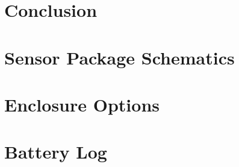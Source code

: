 \documentclass[12pt]{report}
\begin{document}
\chapter{Conclusion}
\label{ch:Collection}
	




\appendix

\chapter{Sensor Package Schematics}
\label{app:Schematic}


\chapter{Enclosure Options}
\label{app:CaseOptions}


\chapter{Battery Log}
\label{app:batterylog}

 
\end{document}
